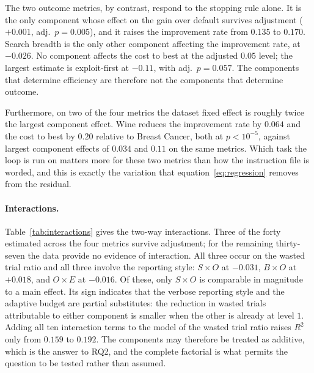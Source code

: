 \documentclass[11pt]{article}
\begin{document}
The two outcome metrics, by contrast, respond to the stopping rule alone. It is the only component whose effect on the gain over default survives adjustment ($+0.001$, adj.\ $p=0.005$), and it raises the improvement rate from $0.135$ to $0.170$. Search breadth is the only other component affecting the improvement rate, at $-0.026$. No component affects the cost to best at the adjusted $0.05$ level; the largest estimate is exploit-first at $-0.11$, with adj.\ $p=0.057$. The components that determine efficiency are therefore not the components that determine outcome.

Furthermore, on two of the four metrics the dataset fixed effect is roughly twice the largest component effect. Wine reduces the improvement rate by $0.064$ and the cost to best by $0.20$ relative to Breast Cancer, both at $p<10^{-5}$, against largest component effects of $0.034$ and $0.11$ on the same metrics. Which task the loop is run on matters more for these two metrics than how the instruction file is worded, and this is exactly the variation that equation~\eqref{eq:regression} removes from the residual.

\paragraph{Interactions.} Table~\ref{tab:interactions} gives the two-way interactions. Three of the forty estimated across the four metrics survive adjustment; for the remaining thirty-seven the data provide no evidence of interaction. All three occur on the wasted trial ratio and all three involve the reporting style: $S\times O$ at $-0.031$, $B\times O$ at $+0.018$, and $O\times E$ at $-0.016$. Of these, only $S\times O$ is comparable in magnitude to a main effect. Its sign indicates that the verbose reporting style and the adaptive budget are partial substitutes: the reduction in wasted trials attributable to either component is smaller when the other is already at level $1$. Adding all ten interaction terms to the model of the wasted trial ratio raises $R^2$ only from $0.159$ to $0.192$. The components may therefore be treated as additive, which is the answer to RQ2, and the complete factorial is what permits the question to be tested rather than assumed.
\end{document}
